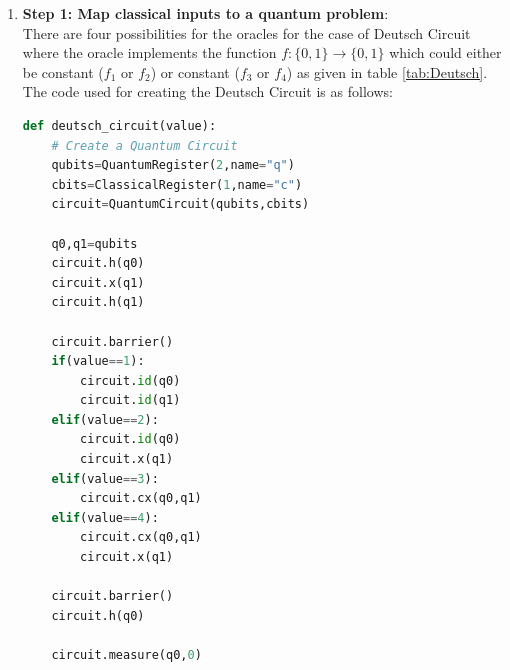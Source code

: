 \documentclass[12pt, oneside]{book}
\theoremstyle{definition}
\theoremstyle{definition}
\theoremstyle{remark}
\begin{document}
\begin{enumerate}
    \item \textbf{Step 1: Map classical inputs to a quantum problem}: \\
    There are four possibilities for the oracles for the case of Deutsch Circuit where the oracle implements the function $f:\{0,1\}\rightarrow \{0,1\}$ which could either be constant ($f_1$ or  $f_2$) or constant ($f_3$ or $f_4$) as given in table \ref{tab:Deutsch}. The code used for creating the Deutsch Circuit is as follows:
    \begin{lstlisting}[language=Python]
def deutsch_circuit(value):
    # Create a Quantum Circuit
    qubits=QuantumRegister(2,name="q")
    cbits=ClassicalRegister(1,name="c")
    circuit=QuantumCircuit(qubits,cbits)
    
    q0,q1=qubits
    circuit.h(q0)
    circuit.x(q1)
    circuit.h(q1)
    
    circuit.barrier()
    if(value==1):
        circuit.id(q0)
        circuit.id(q1)
    elif(value==2):
        circuit.id(q0)
        circuit.x(q1)
    elif(value==3):
        circuit.cx(q0,q1)
    elif(value==4):
        circuit.cx(q0,q1)
        circuit.x(q1)
    
    circuit.barrier()
    circuit.h(q0)
    
    circuit.measure(q0,0)
    

\end{lstlisting}
\end{enumerate}
\end{document}
